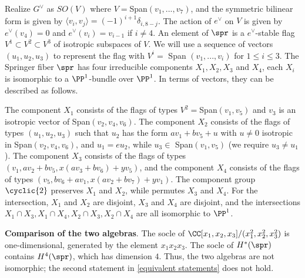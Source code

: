 \documentclass[12pt]{amsart}
\begin{document}
\begin{example}
Realize $G^\vee$ as $SO(V)$ where $V=$Span$(v_1,...,v_7)$, and the symmetric bilinear form is given by $\langle v_i, v_j\rangle= (-1)^{i+1}\delta_{i, 8-j}$. The action of $e^\vee$ on $V$ is given by $e^\vee(v_4)= 0$ and $e^\vee(v_i)= v_{i-1}$ if $i\neq 4$. An element of $\spr$ is a $e^\vee$-stable flag $V^1\subset V^2\subset V^3$ of isotropic subspaces of $V$. We will use a sequence of vectors $(u_1, u_2, u_3)$ to represent the flag with $V^i=$ Span $(v_1,...,v_i)$ for $1\leqslant i\leqslant 3$. The Springer fiber $\spr$ has four irreducible components $X_1, X_2, X_3$ and $X_4$, each $X_i$ is isomorphic to a $\PP^1$-bundle over $\PP^1$. In terms of vectors, they can be described as follows.

The component $X_1$ consists of the flags of types $V^2=$Span$(v_1,v_5)$ and $v_3$ is an isotropic vector of Span$(v_2, v_4, v_6)$. The component $X_2$ consists of the flags of types $(u_1, u_2, u_3)$ such that $u_2$ has the form $av_1+ bv_5+ u$ with $u\neq 0$ isotropic in Span$(v_2,v_4,v_6)$, and $u_1= eu_2$, while $u_3\in$ Span$(v_1,v_5)$ (we require $u_3\neq u_1$). The component $X_3$ consists of the flags of types $(v_1, av_2+ bv_5, x(av_3+ bv_6)+ yv_5)$, and the component $X_4$ consists of the flags of types $(v_5, bv_6+ av_1, x(av_2+ bv_7)+ yv_1)$. The component group $\cyclic{2}$ preserves $X_1$ and $X_2$, while permutes $X_3$ and $X_4$. For the intersection, $X_1$ and $X_2$ are disjoint, $X_3$ and $X_4$ are disjoint, and the intersections $X_1\cap X_3, X_1\cap X_4, X_2\cap X_3, X_2\cap X_4 $ are all isomorphic to $\PP^1$.

\textbf{Comparison of the two algebras}. The socle of $\CC[x_1,x_2, x_3]/(x_1^{2}, x_2^{2}, x_3^{2})$ is one-dimensional, generated by the element $x_1x_2x_3$. The socle of $H^*(\spr)$ contains $H^4(\spr)$, which has dimension $4$. Thus, the two algebras are not isomorphic; the second statement in \cref{equivalent statements} does not hold.
\end{example}
\end{document}

